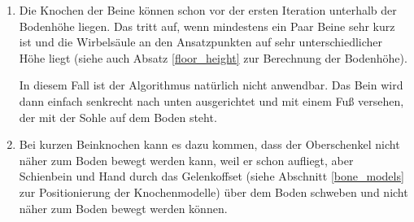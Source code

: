 \begin{enumerate}
 \item %
   Die Knochen der Beine können schon vor der ersten Iteration unterhalb der Bodenhöhe liegen. Das tritt auf, wenn mindestens ein Paar Beine sehr kurz ist und die Wirbelsäule an den Ansatzpunkten auf sehr unterschiedlicher Höhe liegt (siehe auch Absatz \ref{floor_height} zur Berechnung der Bodenhöhe).
   
   In diesem Fall ist der Algorithmus natürlich nicht anwendbar. Das Bein wird dann einfach senkrecht nach unten ausgerichtet und mit einem Fuß versehen, der mit der Sohle auf dem Boden steht.
   
 \item %
   Bei kurzen Beinknochen kann es dazu kommen, dass der Oberschenkel nicht näher zum Boden bewegt werden kann, weil er schon aufliegt, aber Schienbein und Hand durch das Gelenkoffset (siehe Abschnitt \ref{bone_models} zur Positionierung der Knochenmodelle) über dem Boden schweben und nicht näher zum Boden bewegt werden können.
\end{enumerate}







